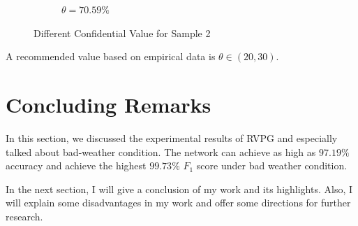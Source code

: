 \begin{spacing}{1.5}
\begin{figure}[!ht]
\begin{subfigure}[b]{0.49\textwidth}
        \caption{$\theta = 70.59\%$}
    \end{subfigure}
    \caption{Different Confidential Value for Sample 2}
    \label{fig:threshold2}
\end{figure}

A recommended value based on empirical data is $\theta \in (20,30)$.

\section{Concluding Remarks}

In this section, we discussed the experimental results of RVPG and especially talked about bad-weather condition. The network can achieve as high as $97.19\%$ accuracy and achieve the highest $99.73\%$ $F_1$ score under bad weather condition.

In the next section, I will give a conclusion of my work and its highlights. Also, I will explain some disadvantages in my work and offer some directions for further research.

\end{spacing}
\newpage
